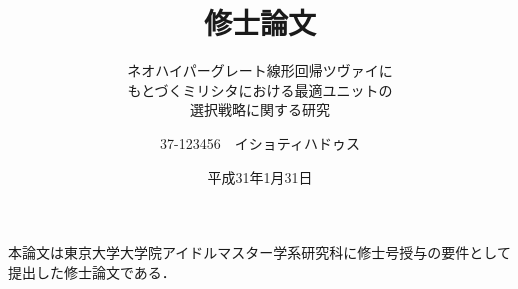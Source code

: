 \documentclass[10ptj,a4j,fleqn,dvipdfmx,uplatex]{jsarticle}
\title{修士論文}
\subtitle{ネオハイパーグレート線形回帰ツヴァイに\\もとづくミリシタにおける最適ユニットの\\選択戦略に関する研究}
\author{37-123456　イショティハドゥス}
\date{平成31年1月31日}
\begin{document}
\maketitle

\null\vfill
\begin{center}
本論文は東京大学大学院アイドルマスター学系研究科に修士号授与の要件として提出した修士論文である．
\end{center}
\vfill
\clearpage

\pagestyle{plain}
\setcounter{page}{1}


\tableofcontents

\listoffigures
\listoftables

\clearpage
{}
\setcounter{page}{1}








\appendix

\end{document}
